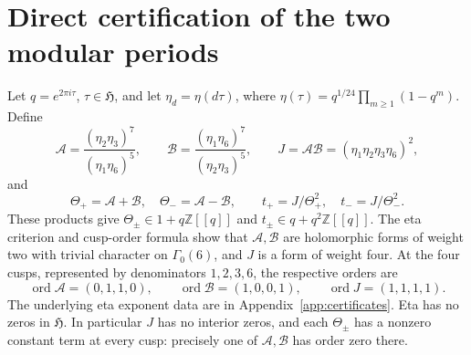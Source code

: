 \documentclass[11pt,a4paper]{article}
\theoremstyle{remark}\newtheorem{remark}[theorem]{Remark}
\newcommand{\Z}{\mathbb Z}\newcommand{\Q}{\mathbb Q}
\newcommand{\HH}{\mathfrak H}
\newcommand{\A}{\mathcal A}\newcommand{\B}{\mathcal B}
\DeclareMathOperator{\ord}{ord}
\begin{document}
\section{Direct certification of the two modular periods}
\label{sec:periods}
Let $q=e^{2\pi i\tau}$, $\tau\in\HH$, and let
$\eta_d=\eta(d\tau)$, where
$\eta(\tau)=q^{1/24}\prod_{m\ge1}(1-q^m)$.
Define
\begin{equation}\label{eq:eta-ABJ}
 \A=\frac{(\eta_2\eta_3)^7}{(\eta_1\eta_6)^5},\qquad
 \B=\frac{(\eta_1\eta_6)^7}{(\eta_2\eta_3)^5},\qquad
 J=\A\B=(\eta_1\eta_2\eta_3\eta_6)^2,
\end{equation}
and
\begin{equation}\label{eq:Theta-t}
 \Theta_+=\A+\B,\quad\Theta_-=\A-\B,
 \qquad t_+=J/\Theta_+^2,\quad t_-=J/\Theta_-^2.
\end{equation}
These products give
$\Theta_\pm\in1+q\Z[[q]]$ and $t_\pm\in q+q^2\Z[[q]]$.
The eta criterion and cusp-order formula
\cite[p.~2]{rousewebb} show that $\A,\B$ are holomorphic forms of weight
two with trivial character on $\Gamma_0(6)$, and $J$ is a form of weight four.
At the four cusps, represented by denominators $1,2,3,6$, the respective
orders are
\begin{equation}\label{eq:cusp-orders}
 \ord\A=(0,1,1,0),\qquad\ord\B=(1,0,0,1),
 \qquad\ord J=(1,1,1,1).
\end{equation}
The underlying eta exponent data are in Appendix~\ref{app:certificates}.
Eta has no zeros in $\HH$. In particular $J$ has no interior zeros, and
each $\Theta_\pm$ has a nonzero constant term at every cusp: precisely
one of $\A,\B$ has order zero there.
\end{document}
